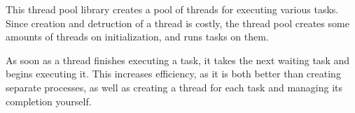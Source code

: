 This thread pool library creates a pool of threads for executing various tasks. Since creation and detruction of a thread is costly, the thread pool creates some amounts of threads on initialization, and runs tasks on them.

As soon as a thread finishes executing a task, it takes the next waiting task and begins executing it. This increases efficiency, as it is both better than creating separate processes, as well as creating a thread for each task and managing it\textquotesingle{}s completion yourself. 